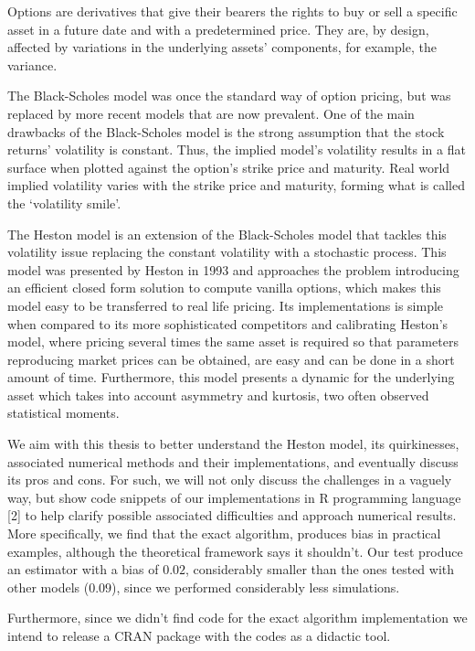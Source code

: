 \documentclass[12pt,oneside]{reedthesis}
\theoremstyle{definition}
\theoremstyle{definition}
\theoremstyle{remark}
\begin{document}
  Options are derivatives that give their bearers the rights to buy or
  sell a specific asset in a future date and with a predetermined price.
  They are, by design, affected by variations in the underlying assets'
  components, for example, the variance.
  
  The Black-Scholes model was once the standard way of option pricing, but
  was replaced by more recent models that are now prevalent. One of the
  main drawbacks of the Black-Scholes model is the strong assumption that
  the stock returns' volatility is constant. Thus, the implied model's
  volatility results in a flat surface when plotted against the option's
  strike price and maturity. Real world implied volatility varies with the
  strike price and maturity, forming what is called the `volatility
  smile'.
  
  The Heston model is an extension of the Black-Scholes model that tackles
  this volatility issue replacing the constant volatility with a
  stochastic process. This model was presented by Heston in 1993 and
  approaches the problem introducing an efficient closed form solution to
  compute vanilla options, which makes this model easy to be transferred
  to real life pricing. Its implementations is simple when compared to its
  more sophisticated competitors and calibrating Heston's model, where
  pricing several times the same asset is required so that parameters
  reproducing market prices can be obtained, are easy and can be done in a
  short amount of time. Furthermore, this model presents a dynamic for the
  underlying asset which takes into account asymmetry and kurtosis, two
  often observed statistical moments.
  
  We aim with this thesis to better understand the Heston model, its
  quirkinesses, associated numerical methods and their implementations,
  and eventually discuss its pros and cons. For such, we will not only
  discuss the challenges in a vaguely way, but show code snippets of our
  implementations in R programming language {[}2{]} to help clarify
  possible associated difficulties and approach numerical results. More
  specifically, we find that the exact algorithm, produces bias in
  practical examples, although the theoretical framework says it
  shouldn't. Our test produce an estimator with a bias of \(0.02\),
  considerably smaller than the ones tested with other models (\(0.09\)),
  since we performed considerably less simulations.
  
  Furthermore, since we didn't find code for the exact algorithm
  implementation we intend to release a CRAN package with the codes as a
  didactic tool.
  
\end{document}
